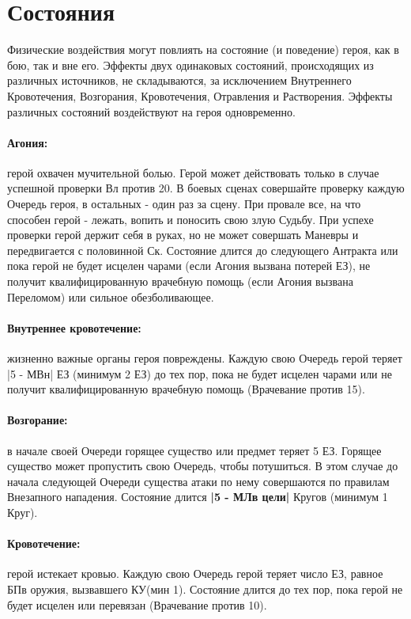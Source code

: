 \section{Состояния}
Физические  воздействия могут повлиять на состояние (и поведение) героя, как в бою, так и вне его. Эффекты двух
одинаковых состояний, происходящих из различных источников, не складываются, за исключением Внутреннего Кровотечения, Возгорания, Кровотечения, Отравления и Растворения. Эффекты различных состояний воздействуют на героя одновременно.
\paragraph{Агония:} герой охвачен мучительной болью. Герой может действовать только в случае успешной проверки Вл против 20. В боевых сценах совершайте проверку каждую Очередь героя, в остальных - один раз за сцену. При провале все, на что способен герой - лежать, вопить и поносить свою злую Судьбу. При успехе проверки герой держит себя в руках, но не может совершать Маневры и передвигается с половинной Ск. Состояние длится до следующего Антракта или пока герой не будет исцелен чарами (если Агония вызвана потерей ЕЗ), не получит квалифицированную врачебную помощь (если Агония вызвана Переломом) или сильное обезболивающее.
\paragraph{Внутреннее кровотечение:} жизненно важные органы героя повреждены. Каждую свою Очередь герой теряет |5 - МВн| ЕЗ (минимум 2 ЕЗ) до тех пор, пока не будет исцелен чарами или не получит квалифицированную врачебную помощь (Врачевание против 15).
\paragraph{Возгорание:} в начале своей Очереди горящее существо или предмет теряет 5 ЕЗ. Горящее существо может пропустить свою Очередь, чтобы потушиться. В этом случае до начала следующей Очереди существа атаки по нему совершаются по правилам Внезапного нападения. Состояние длится \textbf{|5 - МЛв цели|} Кругов (минимум 1 Круг).
\paragraph{Кровотечение:} герой истекает кровью. Каждую свою Очередь герой теряет число ЕЗ, равное БПв оружия, вызвавшего КУ(мин 1). Состояние длится до тех пор, пока герой не будет исцелен или перевязан (Врачевание против 10).
